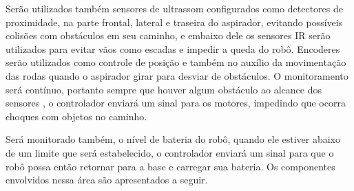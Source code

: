 			Serão utilizados também sensores de ultrassom configurados como detectores de proximidade, na parte frontal, lateral e traseira do aspirador, evitando possíveis colisões com obstáculos em seu caminho, e embaixo dele os sensores IR serão utilizados para evitar vãos como escadas e impedir a queda do robô. Encoderes serão utilizados como controle de posição e também no auxílio da movimentação das rodas quando o aspirador girar para desviar de obstáculos. O monitoramento será contínuo, portanto sempre que houver algum obstáculo ao alcance dos sensores , o controlador enviará um sinal para os motores, impedindo que ocorra choques com objetos no caminho. 

			Será monitorado também, o nível de bateria do robô, quando ele estiver abaixo de um limite que será estabelecido, o controlador enviará um sinal para que o robô possa então retornar para a base e carregar sua bateria. Os componentes envolvidos nessa área são apresentados a seguir.


